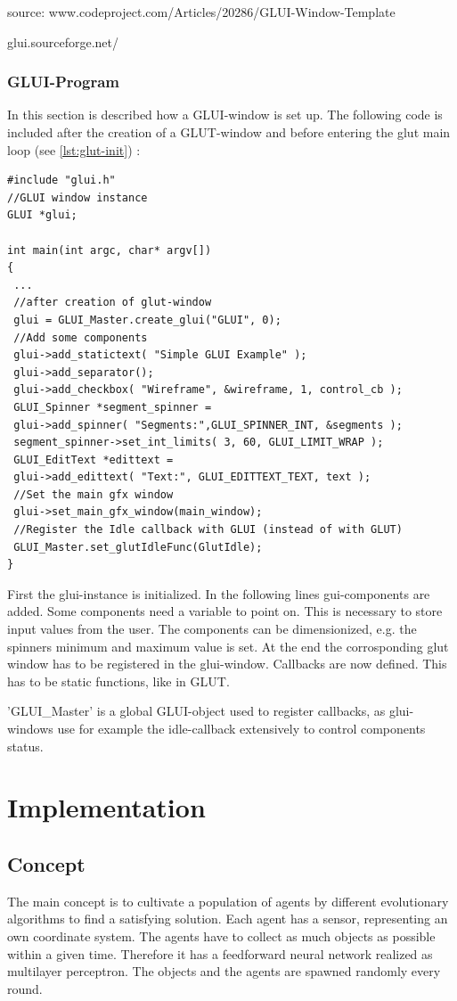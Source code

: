 \documentclass[10pt,a4paper,DIV=11]{scrreprt}
\begin{document}
source: www.codeproject.com/Articles/20286/GLUI-Window-Template

glui.sourceforge.net/


\subsection{GLUI-Program}
In this section is described how a GLUI-window is set up.
The following code is included after the creation of a GLUT-window and before entering the glut main loop (see \ref{lst:glut-init}) :


\begin{lstlisting}[caption={Creating a GLUI-window},label=lst:glui-create]
#include "glui.h"
//GLUI window instance
GLUI *glui;

int main(int argc, char* argv[])
{
 ...
 //after creation of glut-window
 glui = GLUI_Master.create_glui("GLUI", 0);
 //Add some components
 glui->add_statictext( "Simple GLUI Example" );
 glui->add_separator();
 glui->add_checkbox( "Wireframe", &wireframe, 1, control_cb );
 GLUI_Spinner *segment_spinner =
 glui->add_spinner( "Segments:",GLUI_SPINNER_INT, &segments );
 segment_spinner->set_int_limits( 3, 60, GLUI_LIMIT_WRAP );
 GLUI_EditText *edittext =
 glui->add_edittext( "Text:", GLUI_EDITTEXT_TEXT, text );
 //Set the main gfx window
 glui->set_main_gfx_window(main_window);
 //Register the Idle callback with GLUI (instead of with GLUT)
 GLUI_Master.set_glutIdleFunc(GlutIdle);
}
\end{lstlisting}

First the glui-instance is initialized. In the following lines gui-components are added. Some components need a variable to point on. This is necessary to store input values from the user. The components can be dimensionized, e.g. the spinners minimum and maximum value is set.
At the end the corrosponding glut window has to be registered in the glui-window.
Callbacks are now defined. This has to be static functions, like in GLUT.

'GLUI\_Master' is a global GLUI-object used to register callbacks, as glui-windows use for example the idle-callback extensively to control components status.

\chapter{Implementation}

\section{Concept}
The main concept is to cultivate a population of agents by different evolutionary algorithms to find a satisfying solution. Each agent has a sensor, representing an own coordinate system. The agents have to collect as much objects as possible within a given time. Therefore it has a feedforward neural network realized as multilayer perceptron.
The objects and the agents are spawned randomly every round.
\end{document}
